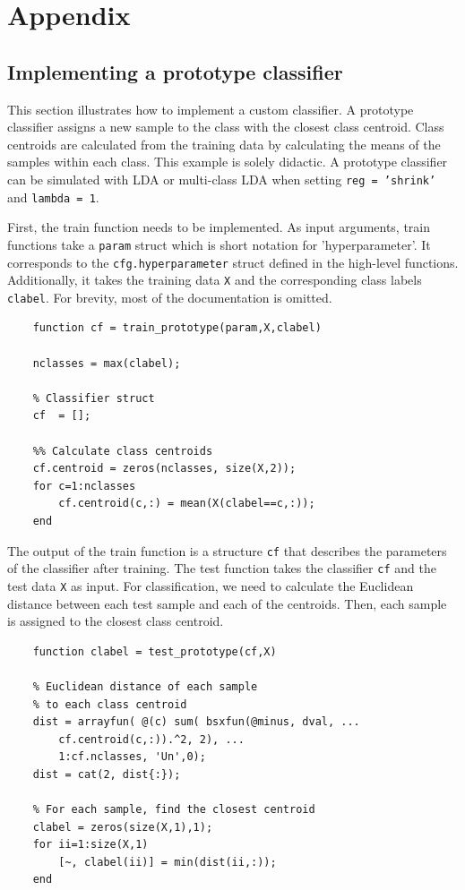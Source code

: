 \documentclass[utf8]{frontiersSCNS} %
\newcommand{\ttt}[1]{\texttt{#1}}
\begin{document}
\section{Appendix}

\subsection{Implementing a prototype classifier}

This section illustrates how to implement a custom classifier. A prototype classifier assigns a new sample to the class with the closest class centroid. Class centroids are calculated from the training data by calculating the means of the samples within each class. This example is solely didactic. A prototype classifier can be simulated with LDA or multi-class LDA when setting \ttt{reg = 'shrink'} and \ttt{lambda = 1}.

First, the train function needs to be implemented. As input arguments, train functions take a \ttt{param} struct which is short notation for 'hyperparameter'. It corresponds to the \ttt{cfg.hyperparameter} struct defined in the high-level functions. Additionally, it takes the training data \ttt{X} and the corresponding class labels \ttt{clabel}. For brevity, most of the documentation is omitted.

\begin{verbatim}
    function cf = train_prototype(param,X,clabel)

    nclasses = max(clabel);

    % Classifier struct
    cf  = [];

    %% Calculate class centroids
    cf.centroid = zeros(nclasses, size(X,2));
    for c=1:nclasses
        cf.centroid(c,:) = mean(X(clabel==c,:));
    end
\end{verbatim}

The output of the train function is a structure \ttt{cf} that describes the parameters of the classifier after training. The test function takes the classifier \ttt{cf} and the test data \ttt{X} as input. For classification, we need to calculate the Euclidean distance between each test sample and each of the centroids. Then, each sample is assigned to the closest class centroid.

\begin{verbatim}
    function clabel = test_prototype(cf,X)

    % Euclidean distance of each sample 
    % to each class centroid
    dist = arrayfun( @(c) sum( bsxfun(@minus, dval, ...
        cf.centroid(c,:)).^2, 2), ...
        1:cf.nclasses, 'Un',0);
    dist = cat(2, dist{:});

    % For each sample, find the closest centroid
    clabel = zeros(size(X,1),1);
    for ii=1:size(X,1)
        [~, clabel(ii)] = min(dist(ii,:));
    end

\end{verbatim}
\end{document}

